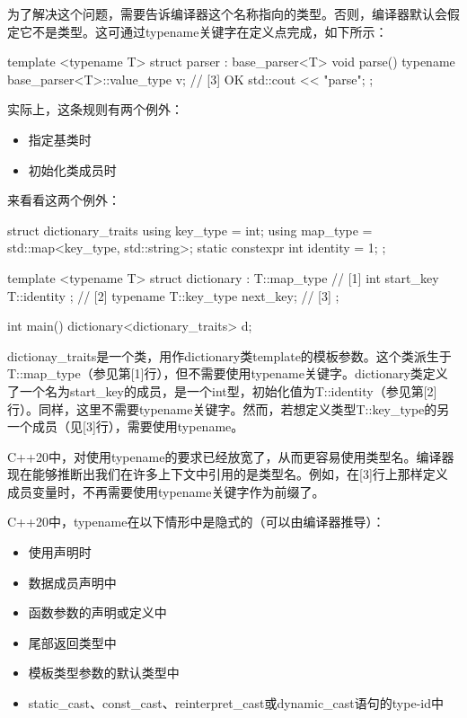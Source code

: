 为了解决这个问题，需要告诉编译器这个名称指向的类型。否则，编译器默认会假定它不是类型。这可通过typename关键字在定义点完成，如下所示：

\begin{cpp}
template <typename T>
struct parser : base_parser<T>
{
	void parse()
	{
		typename base_parser<T>::value_type v{}; // [3] OK
		std::cout << "parse\n";
	}
};
\end{cpp}

实际上，这条规则有两个例外：

\begin{itemize}
  \item 指定基类时
  \item 初始化类成员时
\end{itemize}

来看看这两个例外：

\begin{cpp}
struct dictionary_traits
{
	using key_type = int;
	using map_type = std::map<key_type, std::string>;
	static constexpr int identity = 1;
};

template <typename T>
struct dictionary : T::map_type // [1]
{
	int start_key { T::identity }; // [2]
	typename T::key_type next_key; // [3]
};

int main()
{
	dictionary<dictionary_traits> d;
}
\end{cpp}

dictionay\_traits是一个类，用作dictionary类template的模板参数。这个类派生于T::map\_type（参见第[1]行），但不需要使用typename关键字。dictionary类定义了一个名为start\_key的成员，是一个int型，初始化值为T::identity（参见第[2]行）。同样，这里不需要typename关键字。然而，若想定义类型T::key\_type的另一个成员（见[3]行），需要使用typename。

C++20中，对使用typename的要求已经放宽了，从而更容易使用类型名。编译器现在能够推断出我们在许多上下文中引用的是类型名。例如，在[3]行上那样定义成员变量时，不再需要使用typename关键字作为前缀了。

C++20中，typename在以下情形中是隐式的（可以由编译器推导）：

\begin{itemize}
  \item 使用声明时
  \item 数据成员声明中
  \item 函数参数的声明或定义中
  \item 尾部返回类型中
  \item 模板类型参数的默认类型中
  \item static\_cast、const\_cast、reinterpret\_cast或dynamic\_cast语句的type-id中
\end{itemize}

